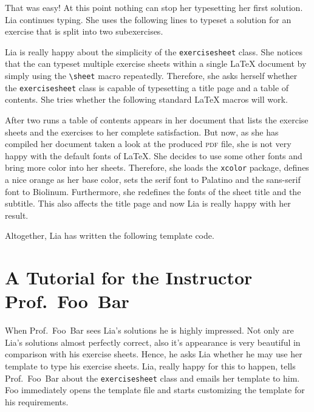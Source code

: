 \documentclass{report}
\def\exercisesheet{\texttt{exercisesheet}}
\begin{document}
That was easy! At this point nothing can stop her typesetting her
first solution. Lia continues typing. She uses the following lines to
typeset a solution for an exercise that is split into two
subexercises.



Lia is really happy about the simplicity of the \exercisesheet{}
class. She notices that the can typeset multiple exercise sheets
within a single \LaTeX{} document by simply using the
\lstinline{\sheet} macro repeatedly. Therefore, she asks herself
whether the \exercisesheet{} class is capable of typesetting a
title page and a table of contents. She tries whether the following
standard \LaTeX{} macros will work.



After two runs a table of contents appears in her document that lists
the exercise sheets and the exercises to her complete satisfaction.
But now, as she has compiled her document taken a look at the produced
\textsc{pdf} file, she is not very happy with the default fonts of
\LaTeX{}. She decides to use some other fonts and bring more color
into her sheets. Therefore, she loads the \lstinline{xcolor} package,
defines a nice orange as her base color, sets the serif font to
Palatino and the sans-serif font to Biolinum. Furthermore, she
redefines the fonts of the sheet title and the subtitle. This also
affects the title page and now Lia is really happy with her result.


Altogether, Lia has written the following template code.




\section{A Tutorial for the Instructor Prof.~Foo~Bar}

When Prof.~Foo~Bar sees Lia's solutions he is highly impressed. Not
only are Lia's solutions almost perfectly correct, also it's
appearance is very beautiful in comparison with his exercise sheets.
Hence, he asks Lia whether he may use her template to type his
exercise sheets. Lia, really happy for this to happen, tells
Prof.~Foo~Bar about the \exercisesheet{} class and emails her template
to him. Foo immediately opens the template file and starts customizing
the template for his requirements.
\end{document}
